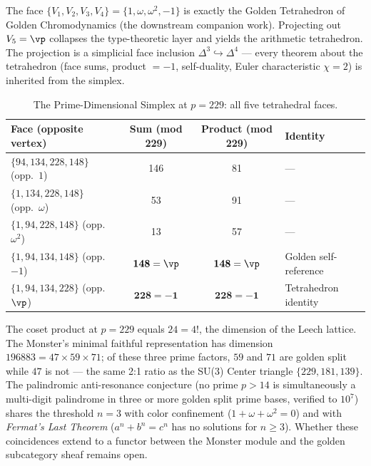 \begin{corollary}\label{cor:projection}
The face $\{V_1, V_2, V_3, V_4\} = \{1, \omega, \omega^2, -1\}$ is exactly the Golden Tetrahedron of Golden Chromodynamics (the downstream companion work). Projecting out $V_5 = \vp$ collapses the type-theoretic layer and yields the arithmetic tetrahedron. The projection is a simplicial face inclusion $\Delta^3 \hookrightarrow \Delta^4$ --- every theorem about the tetrahedron (face sums, product $= -1$, self-duality, Euler characteristic $\chi = 2$) is inherited from the simplex.
\end{corollary}

\begin{table}[!ht]
\centering\small
\caption{The Prime-Dimensional Simplex at $p = 229$: all five tetrahedral faces.}
\begin{tabular}{@{}lccl@{}}
\toprule
\textbf{Face (opposite vertex)} & \textbf{Sum (mod 229)} & \textbf{Product (mod 229)} & \textbf{Identity} \\
\midrule
$\{94, 134, 228, 148\}$ (opp.\ $1$) & 146 & 81 & --- \\
$\{1, 134, 228, 148\}$ (opp.\ $\omega$) & 53 & 91 & --- \\
$\{1, 94, 228, 148\}$ (opp.\ $\omega^2$) & 13 & 57 & --- \\
$\{1, 94, 134, 148\}$ (opp.\ $-1$) & $\mathbf{148 = \vp}$ & $\mathbf{148 = \vp}$ & Golden self-reference \\
$\{1, 94, 134, 228\}$ (opp.\ $\vp$) & $\mathbf{228 = -1}$ & $\mathbf{228 = -1}$ & Tetrahedron identity \\
\bottomrule
\end{tabular}
\end{table}

\begin{remark}\label{rem:24-nexus}
The coset product at $p = 229$ equals $24 = 4!$, the dimension of the Leech lattice. The Monster's minimal faithful representation has dimension $196883 = 47 \times 59 \times 71$; of these three prime factors, $59$ and $71$ are golden split while $47$ is not --- the same 2:1 ratio as the SU(3) Center triangle $\{229, 181, 139\}$. The palindromic anti-resonance conjecture\label{conj:antires} (no prime $p > 14$ is simultaneously a multi-digit palindrome in three or more golden split prime bases, verified to $10^7$) shares the threshold $n = 3$ with color confinement ($1 + \omega + \omega^2 = 0$) and with \emph{Fermat's Last Theorem} ($a^n + b^n = c^n$ has no solutions for $n \geq 3$). Whether these coincidences extend to a functor between the Monster module and the golden subcategory sheaf remains open.
\end{remark}

